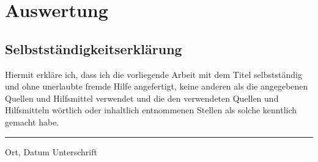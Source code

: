 \chapter{Auswertung}

\section{Selbstständigkeitserklärung}

Hiermit erkläre ich, dass ich die vorliegende Arbeit mit dem Titel  selbstständig und ohne unerlaubte fremde Hilfe angefertigt, keine anderen als die angegebenen Quellen und Hilfsmittel verwendet und die den verwendeten Quellen und Hilfsmitteln wörtlich oder inhaltlich entnommenen Stellen als solche kenntlich gemacht habe.
\vspace{4em}

\hrule width25em
\vspace{0.5em}
Ort, Datum\hspace{11.5em} Unterschrift

